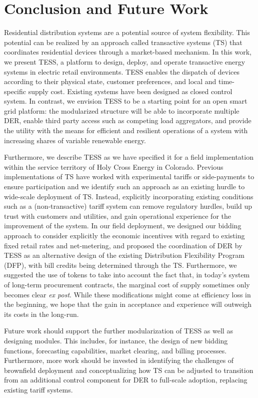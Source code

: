 \section{Conclusion and Future Work}\label{sec:conclusion}

Residential distribution systems are a potential source of system flexibility. This potential can be realized by an approach called transactive systems (TS) that coordinates residential devices through a market-based mechanism.
In this work, we present TESS, a platform to design, deploy, and operate transactive energy systems in electric retail environments. TESS enables the dispatch of devices according to their physical state, customer preferences, and local and time-specific supply cost. 
Existing systems have been designed as closed control system. In contrast, we envision TESS to be a starting point for an open smart grid platform: the modularized structure will be able to incorporate multiple DER, enable third party access such as competing load aggregators, and provide the utility with the means for efficient and resilient operations of a system with increasing shares of variable renewable energy.

Furthermore, we describe TESS as we have specified it for a field implementation within the service territory of Holy Cross Energy in Colorado.
Previous implementations of TS have worked with experimental tariffs or side-payments to ensure participation and we identify such an approach as an existing hurdle to wide-scale deployment of TS. 
Instead, explicitly incorporating existing conditions such as a (non-transactive) tariff system can remove regulatory hurdles, build up trust with customers and utilities, and gain operational experience for the improvement of the system. 
In our field deployment, we designed our bidding approach to consider explicitly the economic incentives with regard to existing fixed retail rates and net-metering, and proposed the coordination of DER by TESS as an alternative design of the existing Distribution Flexibility Program (DFP), with bill credits being determined through the TS. 
Furthermore, we suggested the use of tokens to take into account the fact that, in today's system of long-term procurement contracts, the marginal cost of supply sometimes only becomes clear \textit{ex post}.
While these modifications might come at efficiency loss in the beginning, we hope that the gain in acceptance and experience will outweigh its costs in the long-run.

Future work should support the further modularization of TESS as well as designing modules. This includes, for instance, the design of new bidding functions, forecasting capabilities, market clearing, and billing processes.
Furthermore, more work should be invested in identifying the challenges of brownfield deployment and conceptualizing how TS can be adjusted to transition from an additional control component for DER to full-scale adoption, replacing existing tariff systems.
